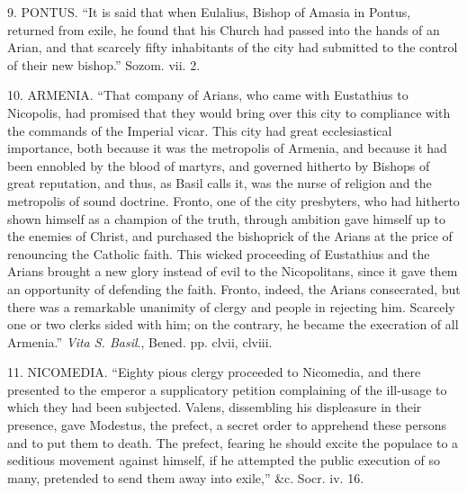 9. PONTUS. ``It is said that when
Eulalius, Bishop of Amasia in Pontus, returned from exile, he found
that his Church had passed into the hands of an Arian, and that
scarcely fifty inhabitants of the city had submitted to the control of
their new bishop.'' Sozom. vii. 2.

10. ARMENIA. ``That company of Arians,
who came with Eustathius to Nicopolis, had promised that they would
bring over this city to compliance with the commands of the Imperial
vicar. This city had great ecclesiastical importance, both because it
was the metropolis of Armenia, and because it had been ennobled by the
blood of martyrs, and governed hitherto by Bishops of great
reputation, and thus, as Basil calls it, was the nurse of religion and
the metropolis of sound doctrine. Fronto, one of the city
presbyters, who had hitherto shown himself as a champion of the truth,
through ambition gave himself up to the enemies of Christ, and
purchased the bishoprick of the Arians at the price of renouncing the
Catholic faith. This wicked proceeding of Eustathius and the Arians
brought a new glory instead of evil to the Nicopolitans, since it gave
them an opportunity of defending the faith. Fronto, indeed, the Arians
consecrated, but there was a remarkable unanimity of clergy and people
in rejecting him. Scarcely one or two clerks sided with him; on the
contrary, he became the execration of all Armenia.'' \emph{Vita S.
Basil}., Bened. pp. clvii, clviii.

11. NICOMEDIA. ``Eighty pious clergy
proceeded to Nicomedia, and there presented to the emperor a
supplicatory petition complaining of the ill-usage to which they had
been subjected. Valens, dissembling his displeasure in their presence,
gave Modestus, the prefect, a secret order to apprehend these persons
and to put them to death. The prefect, fearing he should excite the
populace to a seditious movement against himself, if he attempted the
public execution of so many, pretended to send them away into
exile,'' \&c. Socr. iv. 16.

